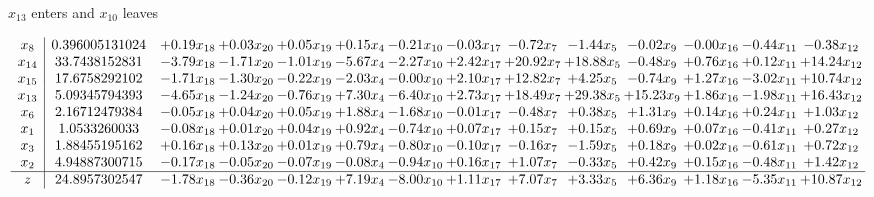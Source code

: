 \documentclass[8pt]{article}
\begin{document}
 $ x_{13} $ enters and $ x_{10} $ leaves 

 \[\begin{array}{c| c c@{\hskip 2pt} c@{\hskip 2pt} c@{\hskip 2pt} c@{\hskip 2pt} c@{\hskip 2pt} c@{\hskip 2pt} c@{\hskip 2pt} c@{\hskip 2pt} c@{\hskip 2pt} c@{\hskip 2pt} c@{\hskip 2pt} c@{\hskip 2pt} }
 x_{8}   &  0.396005131024 & +  0.19 x_{18} & +  0.03 x_{20} & +  0.05 x_{19} & +  0.15 x_{4} & -0.21 x_{10} & -0.03 x_{17} & -0.72 x_{7} & -1.44 x_{5} & -0.02 x_{9} & -0.00 x_{16} & -0.44 x_{11} & -0.38 x_{12}\\
 x_{14}   &  33.7438152831 & -3.79 x_{18} & -1.71 x_{20} & -1.01 x_{19} & -5.67 x_{4} & -2.27 x_{10} & +  2.42 x_{17} & + 20.92 x_{7} & + 18.88 x_{5} & -0.48 x_{9} & +  0.76 x_{16} & +  0.12 x_{11} & + 14.24 x_{12}\\
 x_{15}   &  17.6758292102 & -1.71 x_{18} & -1.30 x_{20} & -0.22 x_{19} & -2.03 x_{4} & -0.00 x_{10} & +  2.10 x_{17} & + 12.82 x_{7} & +  4.25 x_{5} & -0.74 x_{9} & +  1.27 x_{16} & -3.02 x_{11} & + 10.74 x_{12}\\
 x_{13}   &  5.09345794393 & -4.65 x_{18} & -1.24 x_{20} & -0.76 x_{19} & +  7.30 x_{4} & -6.40 x_{10} & +  2.73 x_{17} & + 18.49 x_{7} & + 29.38 x_{5} & + 15.23 x_{9} & +  1.86 x_{16} & -1.98 x_{11} & + 16.43 x_{12}\\
 x_{6}   &  2.16712479384 & -0.05 x_{18} & +  0.04 x_{20} & +  0.05 x_{19} & +  1.88 x_{4} & -1.68 x_{10} & -0.01 x_{17} & -0.48 x_{7} & +  0.38 x_{5} & +  1.31 x_{9} & +  0.14 x_{16} & +  0.24 x_{11} & +  1.03 x_{12}\\
 x_{1}   &  1.0533260033 & -0.08 x_{18} & +  0.01 x_{20} & +  0.04 x_{19} & +  0.92 x_{4} & -0.74 x_{10} & +  0.07 x_{17} & +  0.15 x_{7} & +  0.15 x_{5} & +  0.69 x_{9} & +  0.07 x_{16} & -0.41 x_{11} & +  0.27 x_{12}\\
 x_{3}   &  1.88455195162 & +  0.16 x_{18} & +  0.13 x_{20} & +  0.01 x_{19} & +  0.79 x_{4} & -0.80 x_{10} & -0.10 x_{17} & -0.16 x_{7} & -1.59 x_{5} & +  0.18 x_{9} & +  0.02 x_{16} & -0.61 x_{11} & +  0.72 x_{12}\\
 x_{2}   &  4.94887300715 & -0.17 x_{18} & -0.05 x_{20} & -0.07 x_{19} & -0.08 x_{4} & -0.94 x_{10} & +  0.16 x_{17} & +  1.07 x_{7} & -0.33 x_{5} & +  0.42 x_{9} & +  0.15 x_{16} & -0.48 x_{11} & +  1.42 x_{12}\\
\hline
z    &  24.8957302547 & -1.78 x_{18} & -0.36 x_{20} & -0.12 x_{19} & +  7.19 x_{4} & -8.00 x_{10} & +  1.11 x_{17} & +  7.07 x_{7} & +  3.33 x_{5} & +  6.36 x_{9} & +  1.18 x_{16} & -5.35 x_{11} & + 10.87 x_{12}\\
\end{array}\]
\end{document}
